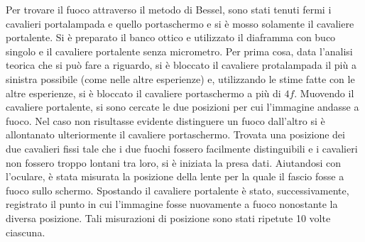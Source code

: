 Per trovare il fuoco attraverso il metodo di Bessel, sono stati tenuti fermi i cavalieri portalampada e quello portaschermo e si è mosso solamente il cavaliere portalente. Si è preparato il banco ottico e utilizzato il diaframma con buco singolo e il cavaliere portalente senza micrometro. Per prima cosa, data l'analisi teorica che si può fare a riguardo, si è bloccato il cavaliere protalampada il più a sinistra possibile (come nelle altre esperienze) e, utilizzando le stime fatte con le altre esperienze, si è bloccato il cavaliere portaschermo a più di $4f$. Muovendo il cavaliere portalente, si sono cercate le due posizioni per cui l'immagine andasse a fuoco. Nel caso non risultasse evidente distinguere un fuoco dall'altro si è allontanato ulteriormente il cavaliere portaschermo. Trovata una posizione dei due cavalieri fissi tale che i due fuochi fossero facilmente distinguibili e i cavalieri non fossero troppo lontani tra loro, si è iniziata la presa dati. Aiutandosi con l'oculare, è stata misurata la posizione della lente per la quale il fascio fosse a fuoco sullo schermo. Spostando il cavaliere portalente è stato, successivamente, registrato il punto in cui l'immagine fosse nuovamente a fuoco nonostante la diversa posizione. Tali misurazioni di posizione sono stati ripetute 10 volte ciascuna.


